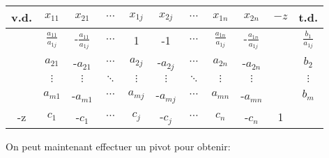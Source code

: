 \begin{center}
	\renewcommand{\arraystretch}{1.5}
	\begin{tabular}{|c|ccccccccc|c|}
		\hline
		v.d. &        $x_{11}$         &         $x_{21}$         & $\cdots$ & $x_{1j}$ & $x_{2j}$  & $\cdots$ &        $x_{1n}$         &         $x_{2n}$         & $-z$ &          t.d.          \\ \hline
		     & $\frac{a_{11}}{a_{1j}}$ & -$\frac{a_{11}}{a_{1j}}$ & $\cdots$ &    1     &    -1     & $\cdots$ & $\frac{a_{1n}}{a_{1j}}$ & -$\frac{a_{1n}}{a_{1j}}$ &      & $\frac{b_{1}}{a_{1j}}$ \\
		     &        $a_{21}$         &        -$a_{21}$         & $\cdots$ & $a_{2j}$ & -$a_{2j}$ & $\cdots$ &        $a_{2n}$         &        -$a_{2n}$         &      &         $b_2$          \\
		     &        $\vdots$         &         $\vdots$         & $\ddots$ & $\vdots$ & $\vdots$  & $\ddots$ &        $\vdots$         &         $\vdots$         &      &        $\vdots$        \\
		     &        $a_{m1}$         &        -$a_{m1}$         & $\cdots$ & $a_{mj}$ & -$a_{mj}$ & $\cdots$ &        $a_{mn}$         &        -$a_{mn}$         &      &         $b_m$          \\ \hline
		 -z  &         $c_{1}$         &         -$c_{1}$         & $\cdots$ & $c_{j}$  & -$c_{j}$  & $\cdots$ &         $c_{n}$         &         -$c_{n}$         &  1   &                        \\ \hline
	\end{tabular}
\end{center}

On peut maintenant effectuer un pivot pour obtenir:

